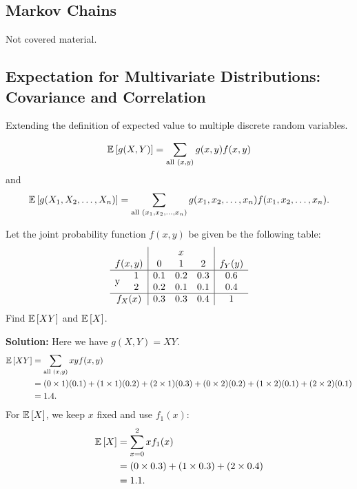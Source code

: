 \subsection{Markov Chains}

Not covered material.


\pagebreak


\subsection{Expectation for Multivariate Distributions: Covariance and Correlation}


Extending the definition of expected value to multiple discrete random variables.
\begin{definition}
    \[\mathbb{E}\left[{g(X,Y)}\right] = \displaystyle \sum_{\text{all } (x,y)} g(x,y)f(x,y)\] and
    \[\mathbb{E}\left[{g(X_1, X_2, \ldots, X_n)}\right] = \sum_{\text{all } (x_1, x_2, \ldots, x_n)} g(x_1, x_2, \ldots, x_n)f(x_1, x_2, \ldots, x_n).\]
\end{definition}

\begin{example}
    Let the joint probability function $f(x,y)$ be given be the following table:
    \[
        \begin{array}{cc|ccc|c}
            & & \multicolumn{3}{c|}{x} & \\
            \multicolumn{2}{c|}{f(x,y)} & 0 & 1 & 2 & f_Y(y) \\
            \hline
            \multirow{2}{*}{y} 
              & 1 & 0.1 & 0.2 & 0.3 & 0.6 \\
              & 2 & 0.2 & 0.1 & 0.1 & 0.4 \\
            \hline
            \multicolumn{2}{c|}{f_X(x)} & 0.3 & 0.3 & 0.4 & 1
        \end{array}
    \]
    Find $\mathbb{E}\left[{XY}\right]$ and $\mathbb{E}\left[{X}\right]$.

    \textbf{Solution:} Here we have $g(X,Y) = XY$. \vspace{-3mm}
    \begin{align*}
        \mathbb{E}\left[{XY}\right] &= \displaystyle \sum_{\text{all } (x,y)} xyf(x,y) \\
        &= (0 \times 1)(0.1) + (1 \times 1)(0.2) + (2 \times 1)(0.3) + (0 \times 2)(0.2) + (1 \times 2)(0.1) + (2 \times 2)(0.1) \\
        &= 1.4.
    \end{align*}
    \phantom{} \vspace{-2mm}
    For $\mathbb{E}\left[{X}\right]$, we keep $x$ fixed and use $f_1(x)$: \vspace{-2mm}
    \begin{align*}
        \mathbb{E}\left[{X}\right] &= \displaystyle \sum_{x=0}^{2} xf_1(x) \\
        &= (0 \times 0.3) + (1 \times 0.3) + (2 \times 0.4) \\
        &= 1.1.
    \end{align*}
\end{example}


